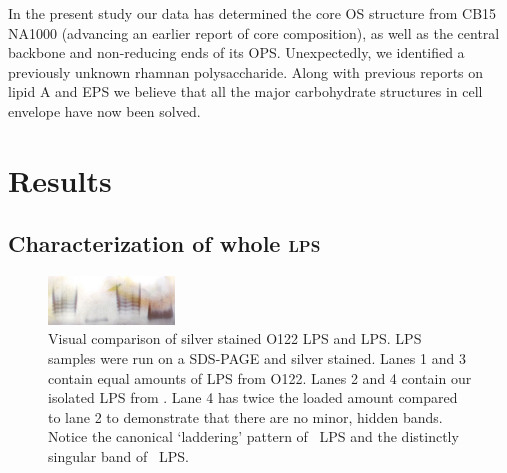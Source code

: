 In the present study our data has determined the core \ac{OS} structure from
\caulobacter CB15 NA1000 (advancing an earlier report of core
composition), as well as the central backbone and
non-reducing ends of its \ac{OPS}. Unexpectedly, we identified a previously
unknown rhamnan polysaccharide. Along with previous reports on lipid
A and \ac{EPS} we believe
that all the major carbohydrate structures in \caulobacter cell envelope have
now been solved.

\section{Results} %
\label{sec:lps_results}
	\subsection{Characterization of whole \textsc{lps}} %
	\label{sub:characterisation_of_whole_lps}
  \begin{figure}[htb]
    \begin{center}
      \includegraphics[width=0.3\textwidth]{lps_chapter/img/lpssilverstain.jpg}
    \end{center}
    \caption[Visual comparison of \ecoli O122 \ac{LPS} and \caulobacter \ac{LPS}]{Visual comparison
      of silver stained \ecoli O122 \ac{LPS} and \caulobacter \ac{LPS}. \ac{LPS} samples were run on
      a \ac{SDS-PAGE} and silver stained. Lanes 1 and 3 contain equal amounts of \ac{LPS} from
      \ecoli O122. Lanes 2 and 4 contain our isolated \ac{LPS} from \caulobacter. Lane 4 has twice
      the loaded amount compared to lane 2 to demonstrate that there are no minor, hidden
      bands. Notice the canonical `laddering' pattern of \ecoli\ \ac{LPS} and the distinctly
      singular band of \caulobacter\ \ac{LPS}.}
    \label{fig:lpssilverstain}
  \end{figure}

